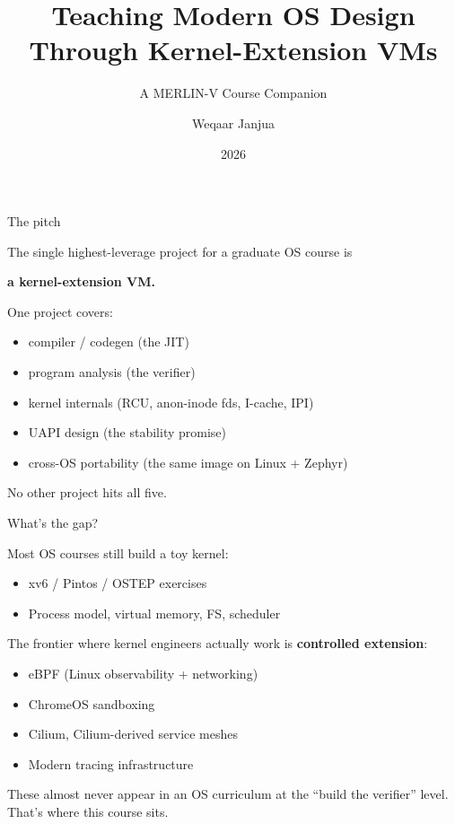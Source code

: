 \documentclass[aspectratio=169,11pt]{beamer}
\title{Teaching Modern OS Design Through Kernel-Extension VMs}
\subtitle{A MERLIN-V Course Companion}
\author{Weqaar Janjua}
\institute{PacketFive --- University of Limerick}
\date{2026}
\begin{document}
\maketitle

\begin{frame}{The pitch}

The single highest-leverage project for a graduate OS course is

\begin{center}
\textbf{a kernel-extension VM.}
\end{center}

\pause
One project covers:
\begin{itemize}
  \item compiler / codegen (the JIT)
  \item program analysis (the verifier)
  \item kernel internals (RCU, anon-inode fds, I-cache, IPI)
  \item UAPI design (the stability promise)
  \item cross-OS portability (the same image on Linux + Zephyr)
\end{itemize}

\pause
No other project hits all five.

\end{frame}

\begin{frame}{What's the gap?}

Most OS courses still build a toy kernel:
\begin{itemize}
  \item xv6 / Pintos / OSTEP exercises
  \item Process model, virtual memory, FS, scheduler
\end{itemize}

\pause

The frontier where kernel engineers actually work is
\textbf{controlled extension}:
\begin{itemize}
  \item eBPF (Linux observability + networking)
  \item ChromeOS sandboxing
  \item Cilium, Cilium-derived service meshes
  \item Modern tracing infrastructure
\end{itemize}

\pause

These almost never appear in an OS curriculum at the
``build the verifier'' level.  That's where this course sits.

\end{frame}
\end{document}
